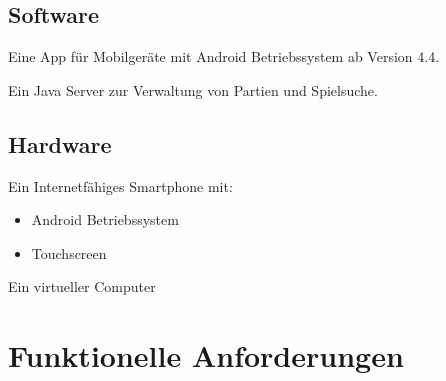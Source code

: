 \documentclass[parskip=full]{scrartcl}
\begin{document}
	\subsection{Software}
		\begin{description}
			\item Eine App für Mobilgeräte mit \gls{Android} Betriebssystem ab Version 4.4.
			\item Ein Java Server zur Verwaltung von Partien und Spielsuche.		
		\end{description}
	\subsection{Hardware}
		\begin{description}			
			\item Ein Internetfähiges \gls{Smartphone} mit:
			\begin{itemize}
			\item \gls{Android} Betriebssystem
			\item Touchscreen
			\end{itemize}
		\item Ein virtueller Computer
		\end{description}
\pagebreak		 
\section{Funktionelle Anforderungen}
\end{document}
